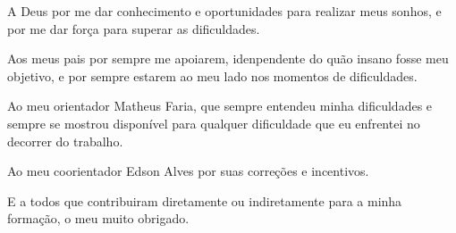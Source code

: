 \begin{agradecimentos}
A Deus por me dar conhecimento e oportunidades para realizar meus sonhos, e por me dar força para superar as dificuldades.

Aos meus pais por sempre me apoiarem, idenpendente do quão insano fosse meu objetivo, e por sempre estarem ao meu lado nos momentos de dificuldades.

Ao meu orientador Matheus Faria, que sempre entendeu minha dificuldades e sempre se mostrou disponível para qualquer dificuldade que eu enfrentei no decorrer do trabalho.

Ao meu coorientador Edson Alves por suas correções e incentivos.

E a todos que contribuiram diretamente ou indiretamente para a minha formação, o meu muito obrigado.
\end{agradecimentos}